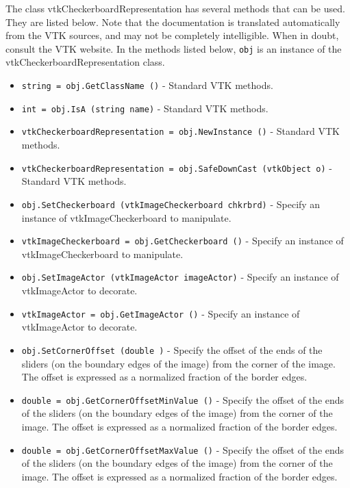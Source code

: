 The class vtkCheckerboardRepresentation has several methods that can be used.
  They are listed below.
Note that the documentation is translated automatically from the VTK sources,
and may not be completely intelligible.  When in doubt, consult the VTK website.
In the methods listed below, \verb|obj| is an instance of the vtkCheckerboardRepresentation class.
\begin{itemize}
\item  \verb|string = obj.GetClassName ()| -  Standard VTK methods.

\item  \verb|int = obj.IsA (string name)| -  Standard VTK methods.

\item  \verb|vtkCheckerboardRepresentation = obj.NewInstance ()| -  Standard VTK methods.

\item  \verb|vtkCheckerboardRepresentation = obj.SafeDownCast (vtkObject o)| -  Standard VTK methods.

\item  \verb|obj.SetCheckerboard (vtkImageCheckerboard chkrbrd)| -  Specify an instance of vtkImageCheckerboard to manipulate.

\item  \verb|vtkImageCheckerboard = obj.GetCheckerboard ()| -  Specify an instance of vtkImageCheckerboard to manipulate.

\item  \verb|obj.SetImageActor (vtkImageActor imageActor)| -  Specify an instance of vtkImageActor to decorate.

\item  \verb|vtkImageActor = obj.GetImageActor ()| -  Specify an instance of vtkImageActor to decorate.

\item  \verb|obj.SetCornerOffset (double )| -  Specify the offset of the ends of the sliders (on the boundary edges of
 the image) from the corner of the image. The offset is expressed as a
 normalized fraction of the border edges.

\item  \verb|double = obj.GetCornerOffsetMinValue ()| -  Specify the offset of the ends of the sliders (on the boundary edges of
 the image) from the corner of the image. The offset is expressed as a
 normalized fraction of the border edges.

\item  \verb|double = obj.GetCornerOffsetMaxValue ()| -  Specify the offset of the ends of the sliders (on the boundary edges of
 the image) from the corner of the image. The offset is expressed as a
 normalized fraction of the border edges.


\end{itemize}
